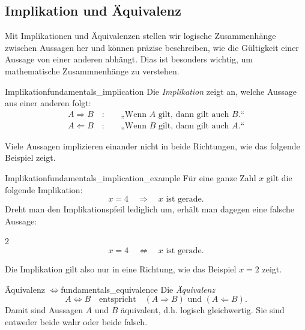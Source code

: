 \subsection{Implikation und Äquivalenz}
\label{subsec:fundamentals_implication_and_equivalence}

Mit Implikationen und Äquivalenzen stellen wir logische Zusammenhänge zwischen
Aussagen her und können präzise beschreiben, wie die Gültigkeit einer Aussage
von einer anderen abhängt. Dias ist besonders wichtig, um mathematische Zusammnenhänge zu verstehen.

\begin{DefinitionBox}{Implikation}{fundamentals_implication}
  Die \emph{Implikation}  zeigt an, welche Aussage aus einer anderen folgt:
  \begin{align*}
    A \Rightarrow B \quad :& \quad \text{„Wenn $A$ gilt, dann gilt auch $B$.“} \\
    A  \Leftarrow B \quad :& \quad \text{„Wenn $B$ gilt, dann gilt auch $A$.“}
  \end{align*}
\end{DefinitionBox}


Viele Aussagen implizieren einander nicht in beide Richtungen, wie das folgende Beispiel zeigt.
\begin{ExampleBox}{Implikation}{fundamentals_implication_example}
  Für eine ganze Zahl $x$ gilt die folgende Implikation:
  \[
    x=4
    \quad\Rightarrow\quad
    x \text{ ist gerade}.
  \]
  Dreht man den Implikationspfeil lediglich um, erhält man dagegen eine falsche
  Aussage:
    \begin{center}
      \begin{ClozeArea}[20]{2}
      \[
           x=4 \quad \nLeftarrow \quad x \text{ ist gerade}.
      \]
      \end{ClozeArea}
    \end{center}
    Die Implikation gilt also nur in eine Richtung, wie das Beispiel $x=2$ zeigt.
\end{ExampleBox}

\begin{DefinitionBox}{Äquivalenz $\Leftrightarrow$}{fundamentals_equivalence}
  Die \emph{Äquivalenz} 
  \[
    A \Leftrightarrow B
    \quad \text{entspricht} \quad
    \left( A \Rightarrow B \right) \text{ und }  \left( A \Leftarrow B \right).
  \]
  Damit sind Aussagen $A$ und $B$ äquivalent, d.h. logisch gleichwertig.
  Sie sind entweder beide wahr oder beide falsch.
\end{DefinitionBox}

